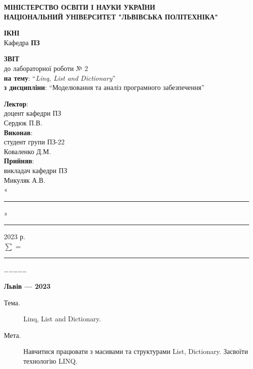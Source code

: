 \documentclass[oneside,14pt]{extarticle}
\newcommand\subject{Моделювання та аналіз програмного забезпечення}
\newcommand\lecturer{доцент кафедри ПЗ \\ Сердюк П.В.}
\newcommand\teacher{викладач кафедри ПЗ \\ Микуляк А.В.}
\newcommand\mygroup{ПЗ-22}
\newcommand\lab{2}
\newcommand\theme{Linq, List and Dictionary}
\newcommand\purpose{Навчитися працювати з масивами та структурами List, Dictionary.
	Засвоїти технологію LINQ}
\begin{document}
\begin{normalsize}
	\begin{titlepage}
		\thispagestyle{empty}
		\begin{center}
			\textbf{МІНІСТЕРСТВО ОСВІТИ І НАУКИ УКРАЇНИ\\
				НАЦІОНАЛЬНИЙ УНІВЕРСИТЕТ "ЛЬВІВСЬКА ПОЛІТЕХНІКА"}
		\end{center}
		\begin{flushright}
			\textbf{ІКНІ}\\
			Кафедра \textbf{ПЗ}
		\end{flushright}
		\vspace{70pt}
		\begin{center}
			\textbf{ЗВІТ}\\
			\vspace{10pt}
			до лабораторної роботи № \lab\\
			\textbf{на тему}: “\textit{\theme}”\\
			\textbf{з дисципліни}: “\subject”
		\end{center}
		\vspace{50pt}
		\begin{flushright}
			
			\textbf{Лектор}:\\
			\lecturer\\
			\vspace{10pt}
			\textbf{Виконав}:\\
			
			студент групи \mygroup\\
			Коваленко Д.М.\\
			\vspace{10pt}
			\textbf{Прийняв}:\\
			
			\teacher\\
			
			\vspace{28pt}
			«\rule{1cm}{0.15mm}» \rule{1.5cm}{0.15mm} 2023 р.\\
			$\sum$ = \rule{1cm}{0.15mm}……………\\
			
		\end{flushright}
		\vspace{\fill}
		\begin{center}
			\textbf{Львів — 2023}
		\end{center}
	\end{titlepage}
		
	\begin{description}
		\item[Тема.] \theme.
		\item[Мета.] \purpose.
	\end{description}


\end{normalsize}
\end{document}
